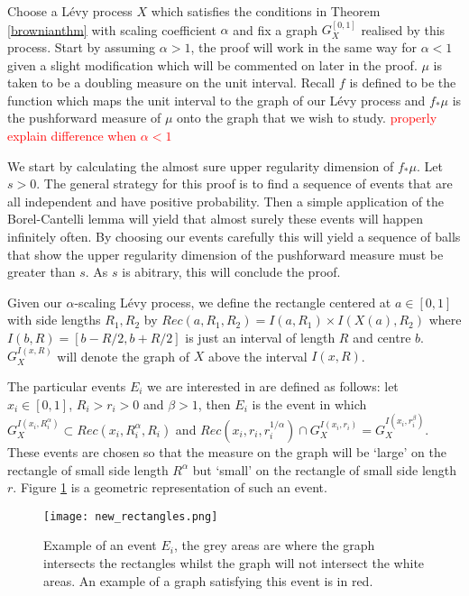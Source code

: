 Choose a L\'evy process $X$ which satisfies the conditions in Theorem \ref{brownianthm} with scaling coefficient $\alpha$ and fix a graph $G_X^{[0,1]}$ realised by this process. Start by assuming $\alpha > 1$, the proof will work in the same way for $\alpha < 1$ given a slight modification which will be commented on later in the proof. $\mu$ is taken to be a doubling measure on the unit interval. Recall $f$ is defined to be the function which maps the unit interval to the graph of our L\'evy process and $f_*\mu$ is the pushforward measure of $\mu$ onto the graph that we wish to study. \textcolor{red}{properly explain difference when $\alpha < 1$}

We start by calculating the almost sure upper regularity dimension of $f_*\mu$. Let $s>0$. The general strategy for this proof is to find a sequence of events that are all independent and have positive probability. Then a simple application of the Borel-Cantelli lemma will yield that almost surely these events will happen infinitely often. By choosing our events carefully this will yield a sequence of balls that show the upper regularity dimension of the pushforward measure must be greater than $s$. As $s$ is abitrary, this will conclude the proof.

Given our $\alpha$-scaling L\'evy process, we define the rectangle centered at $a\in [0,1]$ with side lengths $R_1,R_2$ by $Rec(a,R_1,R_2) = I(a,R_1) \times I(X(a),R_2)$ where $I(b,R) = [b-R/2,b+R/2]$ is just an interval of length $R$ and centre $b$. $G_X^{I(x,R)}$ will denote the graph of $X$ above the interval $I(x,R)$.

The particular events $E_i$ we are interested in are defined as follows: let $x_i \in [0,1]$, $R_i > r_i> 0$ and $\beta > 1$, then $E_i$ is the event in which $G_X^{I(x_i,R_i^{\alpha})} \subset Rec(x_i,R_i^{\alpha},R_i)$ and $Rec(x_i, r_i, r_i^{1/\alpha}) \cap G_X^{I(x_i,r_i)} = G_X^{I(x_i,r_i^{\beta})}$. These events are chosen so that the measure on the graph will be `large' on the rectangle of small side length $R^{\alpha}$ but `small' on the rectangle of small side length $r$. Figure \ref{brownian_event} is a geometric representation of such an event.  

\begin{figure}[htbp]
	\centering
	\texttt{[image: new\_rectangles.png]}
	\caption{Example of an event $E_i$, the grey areas are where the graph intersects the rectangles whilst the graph will not intersect the white areas. An example of a graph satisfying this event is in red.}
	\label{brownian_event}
\end{figure}


